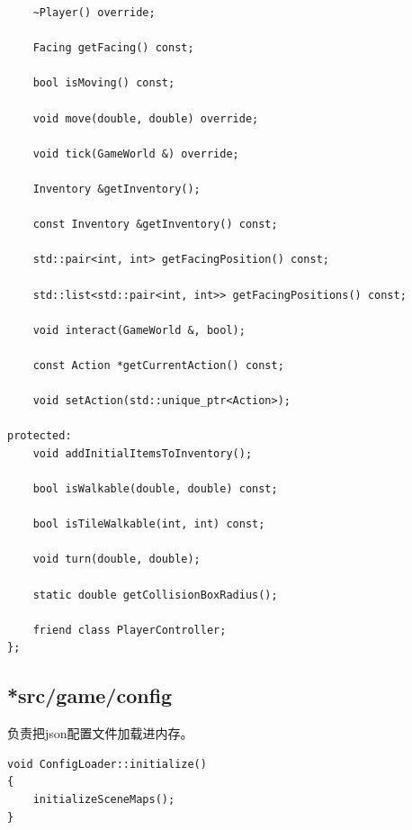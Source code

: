 \documentclass[a4paper,12pt]{report}
\begin{document}
\begin{spacing}{1.5}
\begin{lstlisting}
    ~Player() override;

    Facing getFacing() const;

    bool isMoving() const;

    void move(double, double) override;

    void tick(GameWorld &) override;

    Inventory &getInventory();

    const Inventory &getInventory() const;

    std::pair<int, int> getFacingPosition() const;

    std::list<std::pair<int, int>> getFacingPositions() const;

    void interact(GameWorld &, bool);

    const Action *getCurrentAction() const;

    void setAction(std::unique_ptr<Action>);

protected:
    void addInitialItemsToInventory();

    bool isWalkable(double, double) const;

    bool isTileWalkable(int, int) const;

    void turn(double, double);

    static double getCollisionBoxRadius();

    friend class PlayerController;
};
\end{lstlisting}
\subsection{\textbf{*src/game/config}}
负责把json配置文件加载进内存。
\begin{lstlisting}
void ConfigLoader::initialize()
{
    initializeSceneMaps();
}


\end{lstlisting}
\end{spacing}
\end{document}
